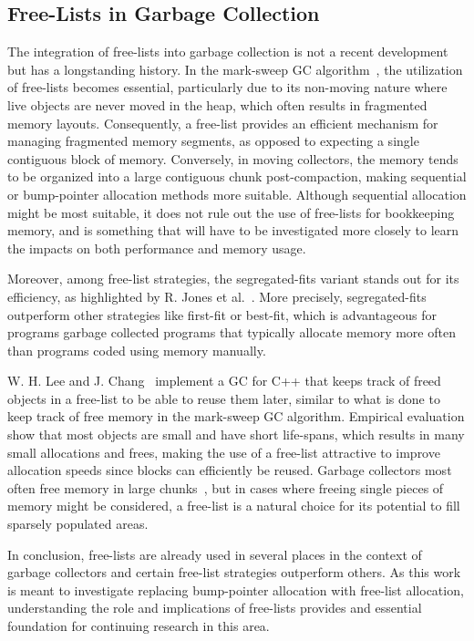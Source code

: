 \subsection{Free-Lists in Garbage Collection}

The integration of free-lists into garbage collection is not a recent development but has a longstanding history. In the mark-sweep GC algorithm~\cite{mark_sweep}, the utilization of free-lists becomes essential, particularly due to its non-moving nature where live objects are never moved in the heap, which often results in fragmented memory layouts. Consequently, a free-list provides an efficient mechanism for managing fragmented memory segments, as opposed to expecting a single contiguous block of memory. Conversely, in moving collectors, the memory tends to be organized into a large contiguous chunk post-compaction, making sequential or bump-pointer allocation methods more suitable. Although sequential allocation might be most suitable, it does not rule out the use of free-lists for bookkeeping memory, and is something that will have to be investigated more closely to learn the impacts on both performance and memory usage.

Moreover, among free-list strategies, the segregated-fits variant stands out for its efficiency, as highlighted by R. Jones et al.~\cite[Section 7.8]{gchandbook}. More precisely, segregated-fits outperform other strategies like first-fit or best-fit, which is advantageous for programs garbage collected programs that typically allocate memory more often than programs coded using memory manually.

W. H. Lee and J. Chang~\cite{samsung_gc_free_list} implement a GC for C++ that keeps track of freed objects in a free-list to be able to reuse them later, similar to what is done to keep track of free memory in the mark-sweep GC algorithm. Empirical evaluation show that most objects are small and have short life-spans, which results in many small allocations and frees, making the use of a free-list attractive to improve allocation speeds since blocks can efficiently be reused. Garbage collectors most often free memory in large chunks~\cite[Section 7.8]{gchandbook}, but in cases where freeing single pieces of memory might be considered, a free-list is a natural choice for its potential to fill sparsely populated areas.

In conclusion, free-lists are already used in several places in the context of garbage collectors and certain free-list strategies outperform others. As this work is meant to investigate replacing bump-pointer allocation with free-list allocation, understanding the role and implications of free-lists provides and essential foundation for continuing research in this area.

